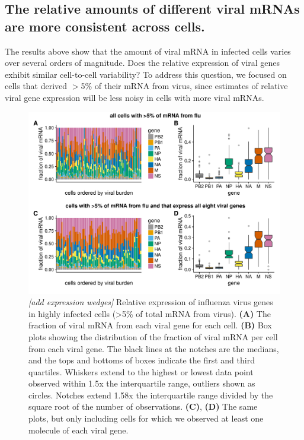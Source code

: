 \documentclass[9pt,lineno]{elife}
\newcommand{\jdbcomment}[1]{\emph{\color{red} [#1]}}
\begin{document}
\subsection{The relative amounts of different viral mRNAs are more consistent across cells.}
The results above show that the amount of viral mRNA in infected cells varies over several orders of magnitude.
Does the relative expression of viral genes exhibit similar cell-to-cell variability?
To address this question, we focused on cells that derived $>$5\% of their mRNA from virus, since estimates of relative viral gene expression will be less noisy in cells with more viral mRNAs.

\begin{figure}
\centerline{\includegraphics[width=0.9\linewidth]{figures/p_flu_expr.pdf}}
\caption{\label{fig:fluexpr}
\jdbcomment{add expression wedges}
Relative expression of influenza virus genes in highly infected cells (>5\% of total mRNA from virus).
{\bf (A)} 
The fraction of viral mRNA from each viral gene for each cell. 
{\bf (B)}
Box plots showing the distribution of the fraction of viral mRNA per cell from each viral gene.
The black lines at the notches are the medians, and the tops and bottoms of boxes indicate the first and third quartiles.
Whiskers extend to the highest or lowest data point observed within 1.5x the interquartile range, outliers shown as circles.
Notches extend 1.58x the interquartile range divided by the square root of the number of observations. 
{\bf (C)}, {\bf (D)} 
The same plots, but only including cells for which we observed at least one molecule of each viral gene.
}
\end{figure}
\end{document}
